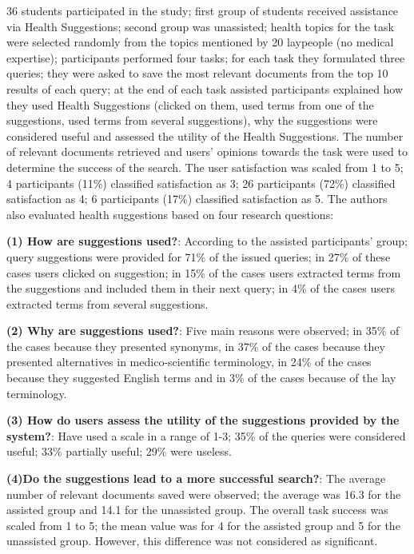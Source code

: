 \documentclass[]{article}
\begin{document}
36 students participated in the study; first group of students received assistance via Health Suggestions; second group was unassisted; health topics for the task were selected randomly from the topics mentioned by 20 laypeople (no medical expertise); participants performed four tasks; for each task they formulated three queries; they were asked to save the most relevant documents from the top 10 results of each query; at the end of each task assisted participants explained how they used Health Suggestions (clicked on them, used terms from one of the suggestions, used terms from several suggestions), why the suggestions were considered useful and assessed the utility of the Health Suggestions. The number of relevant documents retrieved and users' opinions towards the task were used to determine the success of the search. The user satisfaction was scaled from 1 to 5; 4 participants (11\%) classified satisfaction as 3; 26 participants (72\%) classified satisfaction as 4; 6 participants (17\%) classified satisfaction as 5. The authors also evaluated health suggestions based on four research questions:

\textbf{(1) How are suggestions used?}: According to the assisted participants' group; query suggestions were provided for 71\% of the issued queries; in 27\% of these cases users clicked on suggestion; in 15\% of the cases users extracted terms from the suggestions and included them in their next query; in 4\% of the cases users extracted terms from several suggestions.           
 
\textbf{(2) Why are suggestions used?}: Five main reasons were observed; in 35\% of the cases because they presented synonyms, in 37\% of the cases because they presented alternatives in medico-scientific terminology, in 24\% of the cases because they suggested English terms and in 3\% of the cases because of the lay terminology. 
 
\textbf{(3) How do users assess the utility of the suggestions provided by the system?}: Have used a scale in a range of 1-3; 35\% of the queries were considered useful; 33\% partially useful; 29\% were useless.   

\textbf{(4)Do the suggestions lead to a more successful search?}: The average number of relevant documents saved were observed; the average was 16.3 for the assisted group and 14.1 for the unassisted group. The overall task success was scaled from 1 to 5; the mean value was for 4 for the assisted group and 5 for the unassisted group. However, this difference was not considered as significant.   
\end{document}
